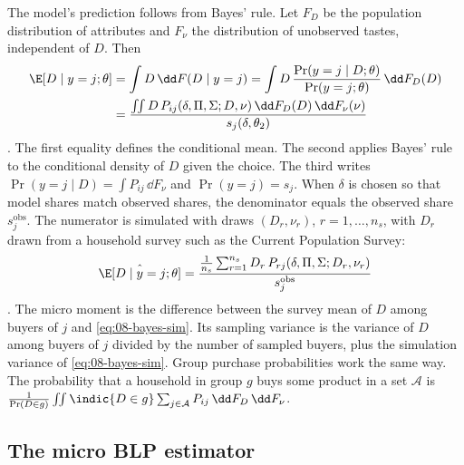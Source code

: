 The model's prediction follows from Bayes' rule. Let $F_D$ be the population distribution of attributes and $F_\nu$
the distribution of unobserved tastes, independent of $D$. Then
\begin{align}
  \E[D \mid y = j; \theta] &= \int D\, \dd F(D \mid y = j) = \int D\,\frac{\Pr(y = j \mid D; \theta)}{\Pr(y = j;
  \theta)}\,\dd F_D(D) \notag\\
  &= \frac{\iint D\, P_{ij}(\delta, \Pi, \Sigma; D, \nu)\,\dd F_D(D)\,\dd F_\nu(\nu)}{s_j(\delta, \theta_2)}
  \label{eq:08-bayes}
\end{align}
\citep[eq.~9]{BerryLevinsohnPakes2004}. The first equality defines the conditional mean. The second applies Bayes' rule
to the conditional density of $D$ given the choice. The third writes $\Pr(y = j \mid D) = \int P_{ij}\,\dd F_\nu$ and
$\Pr(y = j) = s_j$. When $\delta$ is chosen so that model shares match observed shares, the denominator equals the
observed share $s^{\text{obs}}_j$. The numerator is simulated with draws $(D_r, \nu_r)$, $r = 1, \dots, n_s$, with $D_r$ drawn
from a household survey such as the Current Population Survey:
\begin{equation}\label{eq:08-bayes-sim}
  \hat\E[D \mid y = j; \theta] = \frac{\frac{1}{n_s}\sum_{r=1}^{n_s} D_r\,P_{rj}(\delta, \Pi, \Sigma; D_r, \nu_r)}{s^{\text{obs}}_j}
\end{equation}
\citep[eq.~10]{BerryLevinsohnPakes2004}. The micro moment is the difference between the survey mean of $D$ among
buyers of $j$ and \eqref{eq:08-bayes-sim}. Its sampling variance is the variance of $D$ among buyers of $j$ divided by
the number of sampled buyers, plus the simulation variance of \eqref{eq:08-bayes-sim}. Group purchase probabilities
work the same way. The probability that a household in group $g$ buys some product in a set $\mathcal{A}$ is
$\frac{1}{\Pr(D \in g)}\iint \indic\{D \in g\}\sum_{j\in\mathcal{A}}P_{ij}\,\dd F_D\,\dd F_\nu$.

\subsection{The micro BLP estimator}\label{sec:08-micro-blp}

